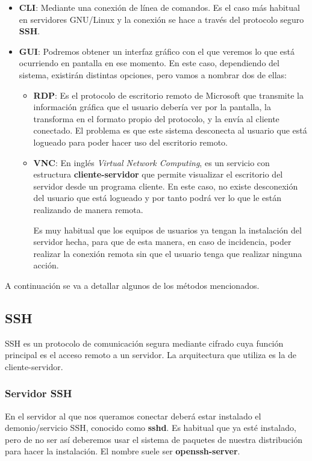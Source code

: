 \begin{itemize}
    \item \textbf{CLI}: Mediante una conexión de línea de comandos. Es el caso más habitual en servidores GNU/Linux y la conexión se hace a través del protocolo seguro \textbf{SSH}.

    \item \textbf{GUI}: Podremos obtener un interfaz gráfico con el que veremos lo que está ocurriendo en pantalla en ese momento. En este caso, dependiendo del sistema, existirán distintas opciones, pero vamos a nombrar dos de ellas:

    \begin{itemize}
        \item \textbf{RDP}: Es el protocolo de escritorio remoto de Microsoft que transmite la información gráfica que el usuario debería ver por la pantalla, la transforma en el formato propio del protocolo, y la envía al cliente conectado. El problema es que este sistema desconecta al usuario que está logueado para poder hacer uso del escritorio remoto.

        \item \textbf{VNC}: En inglés \textit{Virtual Network Computing}, es un servicio con estructura \textbf{cliente-servidor} que permite visualizar el escritorio del servidor desde un programa cliente. En este caso, no existe desconexión del usuario que está logueado y por tanto podrá ver lo que le están realizando de manera remota.

        Es muy habitual que los equipos de usuarios ya tengan la instalación del servidor hecha, para que de esta manera, en caso de incidencia, poder realizar la conexión remota sin que el usuario tenga que realizar ninguna acción.
    \end{itemize}
\end{itemize}

A continuación se va a detallar algunos de los métodos mencionados.


\subsection{SSH}
SSH es un protocolo de comunicación segura mediante cifrado cuya función principal es el acceso remoto a un servidor. La arquitectura que utiliza es la de cliente-servidor.

\subsubsection{Servidor SSH}
En el servidor al que nos queramos conectar deberá estar instalado el demonio/servicio SSH, conocido como \textbf{sshd}. Es habitual que ya esté instalado, pero de no ser así deberemos usar el sistema de paquetes de nuestra distribución para hacer la instalación. El nombre suele ser \textbf{openssh-server}.

